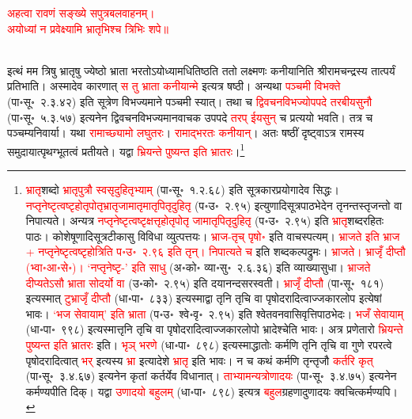 \centering\textcolor{red}{अहत्वा रावणं सङ्ख्ये सपुत्रबलवाहनम्।\nopagebreak\\
अयोध्यां न प्रवेक्ष्यामि भ्रातृभिश्च त्रिभिः शपे॥}\nopagebreak\\
\\
\begin{sloppypar}\justifying\noindent इत्थं मम त्रिषु भ्रातृषु ज्येष्ठो भ्राता भरतोऽयोध्यामधितिष्ठति ततो लक्ष्मणः कनीयानिति श्रीरामचन्द्रस्य तात्पर्यं प्रतिभाति। अस्मादेव कारणात् \textcolor{red}{स तु भ्राता कनीयान्मे} इत्यत्र षष्ठी। अन्यथा \textcolor{red}{पञ्चमी विभक्ते} (पा॰सू॰~२.३.४२) इति सूत्रेण विभज्यमाने पञ्चमी स्यात्। तथा च \textcolor{red}{द्विवचनविभज्योपपदे तरबीयसुनौ} (पा॰सू॰~५.३.५७) इत्यनेन द्विवचन\-विभज्यमान\-वाचक उपपदे \textcolor{red}{तरप्} \textcolor{red}{ईयसुन्} च प्रत्ययो भवति। तत्र च पञ्चम्यनिवार्या। यथा \textcolor{red}{रामाच्छ्यामो लघुतरः}। \textcolor{red}{रामाद्भरतः कनीयान्}। अतः षष्ठीं दृष्ट्वाऽत्र रामस्य समुदायात्पृथग्भूतत्वं प्रतीयते। यद्वा
\textcolor{red}{भ्रियन्ते पुष्यन्त इति भ्रातरः}।\footnote{\textcolor{red}{भ्रातृ}\-शब्दो \textcolor{red}{भ्रातृपुत्रौ स्वसृ\-दुहितृभ्याम्} (पा॰सू॰~१.२.६८) इति सूत्रकार\-प्रयोगादेव सिद्धः। \textcolor{red}{नप्तृ\-नेष्टृ\-त्वष्टृ\-होतृ\-पोतृ\-भ्रातृ\-जामातृ\-मातृ\-पितृ\-दुहितृ} (प॰उ॰~२.९५) इत्युणादि\-सूत्र\-पाठभेदेन तृनन्तस्तृजन्तो वा निपात्यते। अन्यत्र \textcolor{red}{नप्तृ\-नेष्टृ\-त्वष्टृ\-क्षत्तृ\-होतृ\-पोतृ\- जामातृ\-पितृ\-दुहितृ} (प॰उ॰~२.९५) इति \textcolor{red}{भ्रातृ}\-शब्द\-रहितः पाठः। कोशेषूणादि\-सूत्र\-टीकासु विविधा व्युत्पत्तयः। \textcolor{red}{भ्राज-तृच् पृषो॰} इति वाचस्पत्यम्। \textcolor{red}{भ्राजते इति भ्राज + नप्तृ\-नेष्टृ\-त्वष्टृ\-होत्रिति प॰उ॰~२.९६ इति तृन्। निपात्यते च} इति शब्द\-कल्प\-द्रुमः। \textcolor{red}{भ्राजते। भ्राजृँ दीप्तौ (भ्वा॰आ॰से॰)। ‘नप्तृ\-नेष्टृ-’ इति साधु} (अ॰को॰ व्या॰सु॰~२.६.३६) इति व्याख्या\-सुधा। \textcolor{red}{भ्राजते दीप्यतेऽसौ भ्राता सोदर्यो वा} (उ॰को॰~२.९५) इति दयानन्द\-सरस्वती। \textcolor{red}{भ्राजृँ दीप्तौ} (पा॰सू॰~१८१) इत्यस्मात् \textcolor{red}{टुभ्राजृँ दीप्तौ} (धा॰पा॰~८३३) इत्यस्माद्वा तृनि तृचि वा पृषोदरादित्वाज्जकार\-लोप इत्येषां भावः। \textcolor{red}{‘भज सेवायाम्’ इति भ्राता} (प॰उ॰~श्वे॰वृ॰~२.९५) इति श्वेत\-वनवासि\-वृत्ति\-पाठभेदः। \textcolor{red}{भजँ सेवायाम्} (धा॰पा॰~९९८) इत्यस्मात्तृनि तृचि वा पृषोदरादित्वाज्जकार\-लोपो भ्रादेश्चेति भावः। अत्र प्रणेतारो \textcolor{red}{भ्रियन्ते पुष्यन्त इति भ्रातरः} इति। \textcolor{red}{भृञ् भरणे} (धा॰पा॰~८९८) इत्यस्माद्धातोः कर्मणि तृनि तृचि वा गुणे रपरत्वे पृषोदरादित्वात् \textcolor{red}{भर्} इत्यस्य \textcolor{red}{भ्रा} इत्यादेशे \textcolor{red}{भ्रातृ} इति भावः। न च कथं कर्मणि तृन्तृजौ \textcolor{red}{कर्तरि कृत्‌} (पा॰सू॰~३.४.६७) इत्यनेन कृतां कर्तर्येव विधानात्। \textcolor{red}{ताभ्यामन्यत्रोणादयः} (पा॰सू॰~३.४.७५) इत्यनेन कर्मण्यपीति दिक्। यद्वा \textcolor{red}{उणादयो बहुलम्} (धा॰पा॰~८९८) इत्यत्र \textcolor{red}{बहुल}\-ग्रहणादुणादयः क्वचित्कर्मण्यपि।}

\end{sloppypar}
